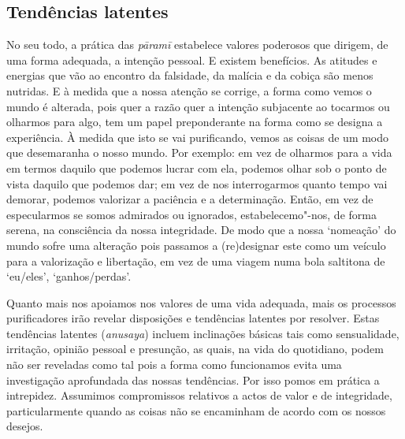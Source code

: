 \subsection{Tendências latentes}

No seu todo, a prática das \emph{pāramī} estabelece valores poderosos que
dirigem, de uma forma adequada, a intenção pessoal. E existem benefícios. As
atitudes e energias que vão ao encontro da falsidade, da malícia e da cobiça são
menos nutridas. E à medida que a nossa atenção se corrige, a forma como vemos o
mundo é alterada, pois quer a razão quer a intenção subjacente ao tocarmos ou
olharmos para algo, tem um papel preponderante na forma como se designa a
experiência. À medida que isto se vai purificando, vemos as coisas de um modo
que desemaranha o nosso mundo. Por exemplo: em vez de olharmos para a vida em
termos daquilo que podemos lucrar com ela, podemos olhar sob o ponto de vista
daquilo que podemos dar; em vez de nos interrogarmos quanto tempo vai demorar,
podemos valorizar a paciência e a determinação. Então, em vez de especularmos se
somos admirados ou ignorados, estabelecemo"-nos, de forma serena, na consciência
da nossa integridade. De modo que a nossa `nomeação' do mundo sofre uma
alteração pois passamos a (re)designar este como um veículo para a valorização e
libertação, em vez de uma viagem numa bola saltitona de `eu/eles',
`ganhos/perdas'.

Quanto mais nos apoiamos nos valores de uma vida adequada, mais os processos
purificadores irão revelar disposições e tendências latentes por resolver. Estas
tendências latentes (\emph{anusaya}) incluem inclinações básicas tais como
sensualidade, irritação, opinião pessoal e presunção, as quais, na vida do
quotidiano, podem não ser reveladas como tal pois a forma como funcionamos evita
uma investigação aprofundada das nossas tendências. Por isso pomos em prática a
intrepidez. Assumimos compromissos relativos a actos de valor e de integridade,
particularmente quando as coisas não se encaminham de acordo com os nossos
desejos.

